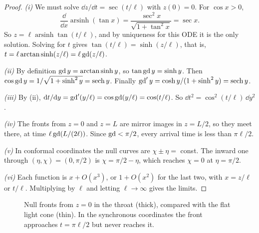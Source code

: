 \begin{proof}
\emph{(i)} We must solve $\dd z/\dd t=\sec(t/\ell)$ with $z(0)=0$. For $\cos x>0$,
\[
\frac{\dd}{\dd x}\operatorname{arsinh}(\tan x)=\frac{\sec^2x}{\sqrt{1+\tan^2x}}=\sec x .
\]
So $z=\ell\operatorname{arsinh}\tan(t/\ell)$, and by uniqueness for this ODE it is the only solution. Solving for $t$ gives $\tan(t/\ell)=\sinh(z/\ell)$, that is, $t=\ell\arctan\sinh(z/\ell)=\ell\operatorname{gd}(z/\ell)$.

\emph{(ii)} By definition $\operatorname{gd} y=\arctan\sinh y$, so $\tan\operatorname{gd} y=\sinh y$. Then $\cos\operatorname{gd} y=1/\sqrt{1+\sinh^2y}=\operatorname{sech}y$. Finally $\operatorname{gd}'y=\cosh y/(1+\sinh^2y)=\operatorname{sech}y$.

\emph{(iii)} By (ii), $\mathrm{d} t/\mathrm{d} y=\operatorname{gd}'(y/\ell)=\cos\operatorname{gd}(y/\ell)=\cos(t/\ell)$. So $\dd t^2=\cos^2(t/\ell)\,\dd y^2$.

\emph{(iv)} The fronts from $z=0$ and $z=L$ are mirror images in $z=L/2$, so they meet there, at time $\ell\operatorname{gd}(L/(2\ell))$. Since $\operatorname{gd}<\pi/2$, every arrival time is less than $\pi\ell/2$.

\emph{(v)} In conformal coordinates the null curves are $\chi\pm\eta=$ const. The inward one through $(\eta,\chi)=(0,\pi/2)$ is $\chi=\pi/2-\eta$, which reaches $\chi=0$ at $\eta=\pi/2$.

\emph{(vi)} Each function is $x+O(x^3)$, or $1+O(x^2)$ for the last two, with $x=z/\ell$ or $t/\ell$. Multiplying by $\ell$ and letting $\ell\to\infty$ gives the limits.
\end{proof}


\begin{figure}[t]
\centering
{}
\caption{Null fronts from $z=0$ in the throat (thick), compared with the flat light cone (thin). In the synchronous coordinates the front approaches $t=\pi\ell/2$ but never reaches it.}
\label{fig:fronts}
\end{figure}


